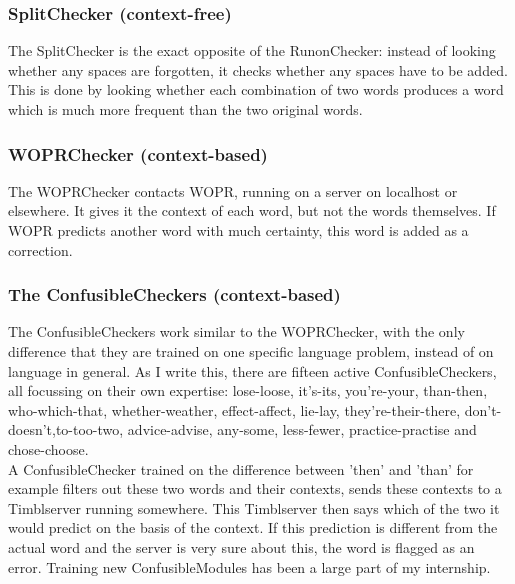\documentclass[12pt]{article}
\begin{document}
\subsubsection{SplitChecker (context-free)}
The SplitChecker is the exact opposite of the RunonChecker: instead of looking whether any spaces are forgotten, it checks whether any spaces have to be added. This is done by looking whether each combination of two words produces a word which is much more frequent than the two original words.

\subsubsection{WOPRChecker (context-based)}
The WOPRChecker contacts WOPR, running on a server on localhost or elsewhere. It gives it the context of each word, but not the words themselves. If WOPR predicts another word with much certainty, this word is added as a correction.  

\subsubsection{The ConfusibleCheckers (context-based)}
The ConfusibleCheckers work similar to the WOPRChecker, with the only difference that they are trained on one specific language problem, instead of on language in general. As I write this, there are fifteen active ConfusibleCheckers, all focussing on their own expertise: lose-loose, it's-its, you're-your, than-then, who-which-that, whether-weather, effect-affect, lie-lay, they're-their-there, don't-doesn't,to-too-two, advice-advise, any-some, less-fewer, practice-practise and chose-choose.
\\\indent
A ConfusibleChecker trained on the difference between 'then' and 'than' for example filters out these two words and their contexts, sends these contexts to a Timblserver running somewhere. This Timblserver then says which of the two it would predict on the basis of the context. If this prediction is different from the actual word and the server is very sure about this, the word is flagged as an error. Training new ConfusibleModules has been a large part of my internship.
\end{document}
